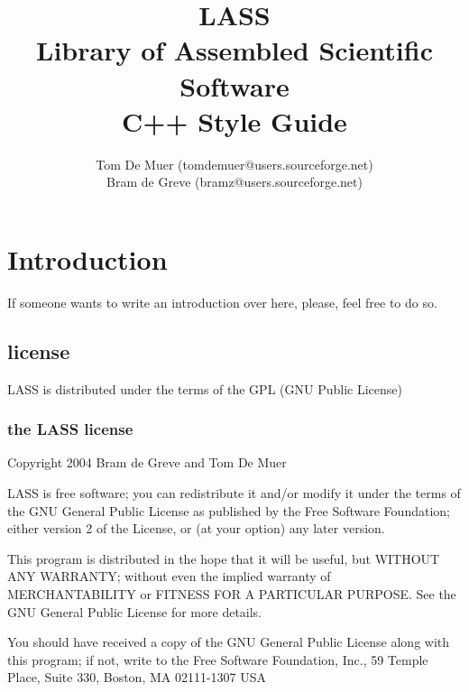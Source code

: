 \documentclass[10pt,a4paper,titlepage,dutch]{report}
\begin{document}
\title{LASS\\Library of Assembled Scientific Software\\C++ Style Guide}
\author{Tom De Muer (tomdemuer@users.sourceforge.net) \\ Bram de Greve (bramz@users.sourceforge.net)}



\maketitle

\tableofcontents

\chapter{Introduction}

If someone wants to write an introduction over here, please, feel
free to do so.

\section{license}

LASS is distributed under the terms of the GPL (GNU Public
License)

\subsection*{the LASS license}

Copyright 2004 Bram de Greve and Tom De Muer

LASS is free software; you can redistribute it and/or modify it
under the terms of the GNU General Public License as published by
the Free Software Foundation; either version 2 of the License, or
(at your option) any later version.

This program is distributed in the hope that it will be useful,
but WITHOUT ANY WARRANTY; without even the implied warranty of
MERCHANTABILITY or FITNESS FOR A PARTICULAR PURPOSE.  See the GNU
General Public License for more details.

You should have received a copy of the GNU General Public License
along with this program; if not, write to the Free Software
Foundation, Inc., 59 Temple Place, Suite 330, Boston, MA
02111-1307  USA
\end{document}
